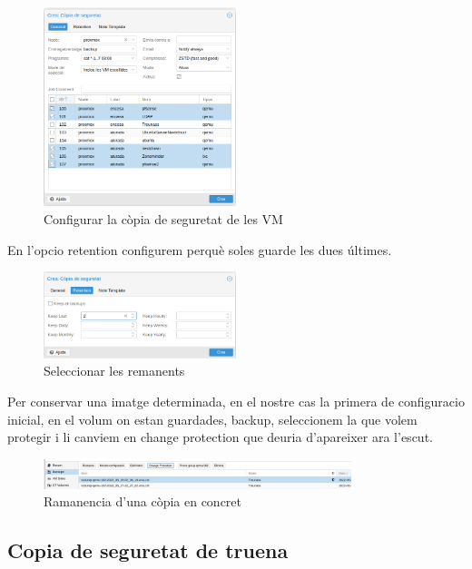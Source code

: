 \documentclass[
  10pt,
]{krantz}
\begin{document}
\begin{figure}
\centering
\includegraphics[width=0.5\textwidth,height=\textheight]{imatges/proxmox/backup1.png}
\caption{Configurar la còpia de seguretat de les VM}
\end{figure}

En l'opcio retention configurem perquè soles guarde les dues últimes.

\begin{figure}
\centering
\includegraphics[width=0.5\textwidth,height=\textheight]{imatges/proxmox/backup2.png}
\caption{Seleccionar les remanents}
\end{figure}

Per conservar una imatge determinada, en el nostre cas la primera de configuracio inicial, en el volum on estan guardades, backup, seleccionem la que volem protegir i li canviem en change protection que deuria d'apareixer ara l'escut.

\begin{figure}
\centering
\includegraphics[width=0.8\textwidth,height=\textheight]{imatges/proxmox/protect.png}
\caption{Ramanencia d'una còpia en concret}
\end{figure}

\hypertarget{copia-de-seguretat-de-truena}{%
\subsection{Copia de seguretat de truena}\label{copia-de-seguretat-de-truena}}
\end{document}
